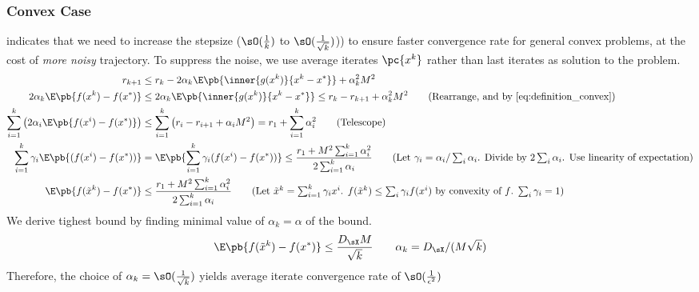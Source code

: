 \documentclass[../summary.tex]{subfiles}
\begin{document}
\subsubsection{Convex Case}

\cite{nemirovskiRobustStochasticApproximation2009} indicates that we need to increase the stepsize ($\sO(\frac{1}{k})$ to $\sO(\frac{1}{\sqrt{k}})$)) to ensure faster convergence rate for general convex problems, at the cost of \textit{more noisy} trajectory. To suppress the noise, we use average iterates $\pc{x^k}$ rather than last iterates as solution to the problem.
\begin{align*}
    r_{k+1}
        &\leq r_k - 2\alpha_k \E\pb{\inner{g(x^k)}{x^k-x^*}} + \alpha_k^2 M^2\\
    2\alpha_k \E\pb{ f(x^k) - f(x^*) }
        &\leq 2\alpha_k \E\pb{\inner{g(x^k)}{x^k - x^*}}
        \leq r_k - r_{k+1} + \alpha_k^2 M^2
            \tag{Rearrange, and by \ref{eq:definition_convex}} \\
    \sum_{i=1}^k \left( 2\alpha_i \E\pb{f(x^i) - f(x^*)} \right)
        &\leq \sum_{i=1}^k \left( r_i - r_{i+1} + \alpha_i M^2\right)
        = r_1 + \sum_{i=1}^k \alpha_i^2 
            \tag{Telescope} \\ 
    \sum_{i=1}^k \gamma_i \E\pb{(f(x^i) - f(x^*))}
        &= \E\pb{\sum_{i=1}^k \gamma_i (f(x^i) - f(x^*))}
        \leq \frac{r_1 + M^2 \sum_{i=1}^k \alpha_i^2}{2\sum_{i=1}^k \alpha_i}
            \tag{Let $\gamma_i = \alpha_i/\sum_i\alpha_i$. Divide by $2\sum_i\alpha_i$. Use linearity of expectation} \\
    \E\pb{f(\tilde{x}^k) - f(x^*)}
        &\leq \frac{r_1 + M^2 \sum_{i=1}^k \alpha_i^2}{2\sum_{i=1}^k \alpha_i}
            \tag{Let $\tilde{x}^k = \sum_{i=1}^k \gamma_i x^i$. $f(\tilde{x}^k)\leq \sum_i \gamma_i f(x^i)$ by convexity of $f$. $\sum_i\gamma_i = 1$}
\end{align*}
We derive tighest bound by finding minimal value of $\alpha_k = \alpha$ of the bound.
\[
    \E\pb{f(\tilde{x}^k) - f(x^*)}
        \leq \frac{D_{\sX}M}{\sqrt{k}}
        \quad\quad
        \alpha_k = D_{\sX} / (M\sqrt{k})
\]
Therefore, the choice of $\alpha_k = \sO(\frac{1}{\sqrt{k}})$ yields average iterate convergence rate of $\sO(\frac{1}{\epsilon^2})$
\end{document}
